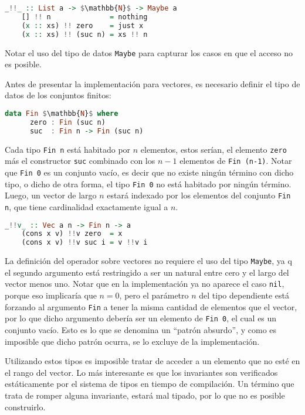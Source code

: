 \begin{lstlisting}[mathescape, language=Haskell, deletekeywords={zero}]
	_!!_ :: List a -> $\mathbb{N}$ -> Maybe a
	[] !! n              = nothing
	(x :: xs) !! zero    = just x
	(x :: xs) !! (suc n) = xs !! n
\end{lstlisting}

Notar el uso del tipo de datos \verb|Maybe| para capturar los casos en que el acceso no es posible.

Antes de presentar la implementación para vectores, es necesario definir el tipo de datos de los conjuntos finitos:

\begin{lstlisting}[mathescape, language=Haskell, deletekeywords={zero}]
	data Fin $\mathbb{N}$ where
	  zero : Fin (suc n)
	  suc  : Fin n -> Fin (suc n)
\end{lstlisting}

Cada tipo \verb|Fin n| está habitado por $n$ elementos, estos serían, el elemento \verb|zero| más el constructor \verb|suc| combinado con los $n-1$ elementos de \verb|Fin (n-1)|.
Notar que \verb|Fin 0| es un conjunto vacío, es decir que no existe ningún término con dicho tipo, o dicho de otra forma, el tipo \verb|Fin 0| no está habitado por ningún término.
Luego, un vector de largo $n$ estará indexado por los elementos del conjunto \verb|Fin n|, que tiene cardinalidad exactamente igual a $n$.

\begin{lstlisting}[mathescape, language=Haskell, deletekeywords={zero}]
	_!!v_ :: Vec a n -> Fin n -> a
	(cons x v) !!v zero  = x
	(cons x v) !!v suc i = v !!v i
\end{lstlisting}

La definición del operador sobre vectores no requiere el uso del tipo \verb|Maybe|, ya q el segundo argumento está restringido a ser un natural entre cero y el largo del vector menos uno.
Notar que en la implementación ya no aparece el caso \verb|nil|, porque eso implicaría que $n = 0$, pero el parámetro $n$ del tipo dependiente está forzando al argumento \verb|Fin| a tener la misma cantidad de elementos que el vector, por lo que dicho argumento debería ser un elemento de \verb|Fin 0|, el cual es un conjunto vacío.
Esto es lo que se denomina un ``patrón absurdo'', y como es imposible que dicho patrón ocurra, se lo excluye de la implementación.

Utilizando estos tipos es imposible tratar de acceder a un elemento que no esté en el rango del vector.
Lo más interesante es que los invariantes son verificados estáticamente por el sistema de tipos en tiempo de compilación.
Un término que trata de romper alguna invariante, estará mal tipado, por lo que no es posible construirlo.


